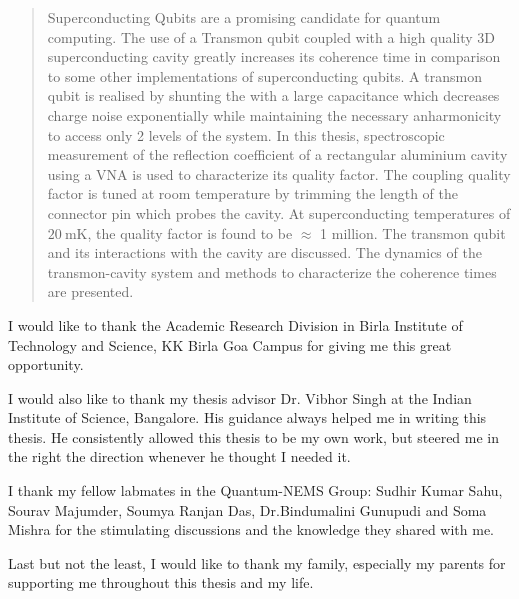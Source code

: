 \documentclass[
11pt, %
oneside, %
english, %
doublespacing, %
headsepline, %
]{MastersDoctoralThesis} %
\begin{document}
\begin{abstract}
\addchaptertocentry{\abstractname} %
Superconducting Qubits are a promising candidate for quantum computing. The use of a Transmon qubit coupled with a high quality 3D superconducting cavity greatly increases its coherence time in comparison to some other implementations of superconducting qubits. A transmon qubit is realised by shunting the \JJ with a large capacitance which decreases charge noise exponentially while maintaining the necessary anharmonicity to access only 2 levels of the system. In this thesis, spectroscopic measurement of the reflection coefficient of a rectangular aluminium cavity using a VNA is used to characterize its quality factor. The coupling quality factor is tuned at room temperature by trimming the length of the connector pin which probes the cavity. At superconducting temperatures of $\SI{20}{\milli\kelvin}$, the quality factor is found to be $\approx$ 1 million. The transmon qubit and its interactions with the cavity are discussed. The dynamics of the transmon-cavity system and methods to characterize the coherence times are presented.
\end{abstract}


\begin{acknowledgements}
\addchaptertocentry{\acknowledgementname} %
I would like to thank the Academic Research Division in Birla Institute of Technology and Science, KK Birla Goa Campus for giving me this great opportunity.
 
I would also like to thank my thesis advisor Dr. Vibhor Singh at the Indian Institute of Science, Bangalore. His guidance always helped me in writing this thesis. He consistently allowed this thesis to be my own work, but steered me in the right the direction whenever he thought I needed it.

I thank my fellow labmates in the Quantum-NEMS Group: Sudhir Kumar Sahu, Sourav Majumder, Soumya Ranjan Das, Dr.Bindumalini Gunupudi and Soma Mishra for the stimulating discussions and the knowledge they shared with me.

Last but not the least, I would like to thank my family, especially my parents for supporting me throughout this thesis and my life.
\end{acknowledgements}
\end{document}
